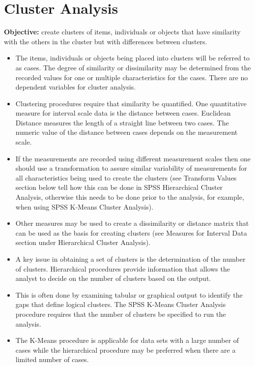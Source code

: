 \documentclass[a4paper,12pt]{article}
\begin{document}
\section{Cluster Analysis}
\noindent \textbf{Objective:} create clusters of items, individuals or objects that have similarity with the others in the cluster but with differences between clusters.  

\begin{itemize}
	\item The items, individuals or objects being placed into clusters will be referred to as cases.  The degree of similarity or dissimilarity may be determined from the recorded values for one or multiple characteristics for the cases.  There are no dependent variables for cluster analysis.  
\item Clustering procedures require that similarity be quantified.  One quantitative measure for interval scale data is the distance between cases.  Euclidean Distance measures the length of a straight line between two cases.  The numeric value of the distance between cases depends on the measurement scale.  
\item If the measurements are recorded using different measurement scales then one should use a transformation to assure similar variability of measurements for all characteristics being used to create the clusters (see Transform Values section below tell how this can be done in SPSS Hierarchical Cluster Analysis, otherwise this needs to be done prior to the analysis, for example, when using SPSS K-Means Cluster Analysis).  
\item Other measures may be used to create a dissimilarity or distance matrix that can be used as the basis for creating clusters (see Measures for Interval Data section under Hierarchical Cluster Analysis).  
	
\item A key issue in obtaining a set of clusters is the determination of the number of clusters.  Hierarchical procedures provide information that allows the analyst to decide on the number of clusters based on the output. 
\item  This is often done by examining tabular or graphical output to identify the gaps that define logical clusters.  The SPSS K-Means Cluster Analysis procedure requires that the number of clusters be specified to run the analysis. 
\item  The K-Means procedure is applicable for data sets with a large number of cases while the hierarchical procedure may be preferred when there are a limited number of cases.
\end{itemize}
\end{document}
